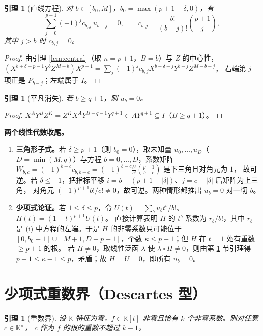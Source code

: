 \documentclass[11pt,UTF8]{ctexart}
\newtheorem{lemma}[theorem]{引理}
\theoremstyle{definition}
\newcommand{\K}{\mathbb{K}}
\begin{document}
\begin{lemma}[直线方程]\label{lem:line-eq}
对 $b\in[b_0,M]$，$b_0=\max(p+1-\delta,0)$，有
\[
\sum_{j=0}^{p+1}(-1)^{j}c_{b,j}\,u_{b-j}=0,\qquad c_{b,j}=\frac{b!}{(b-j)!}\binom{p+1}{j},
\]
其中 $j>b$ 时 $c_{b,j}=0$。
\end{lemma}

\begin{proof}
由引理 \ref{lem:central}（取 $n=p+1$，$B=b$）与 $Z$ 的中心性，
$(X^{b+\delta-p-1}Y^{b}Z^{M-b})X^{p+1}=\sum_j(-1)^jc_{b,j}X^{b+\delta-j}Y^{b-j}Z^{M-b+j}$，
右端第 $j$ 项正是 $P_{b-j}$；左端属于 $I$。
\end{proof}

\begin{lemma}[平凡消失]\label{lem:triv2}
若 $b\ge q+1$，则 $u_b=0$。
\end{lemma}

\begin{proof}
$X^{A}Y^{B}Z^{K}=Z^{K}X^{A}Y^{B-q-1}Y^{q+1}\in AY^{q+1}\subseteq I$（$B\ge q+1$）。
\end{proof}

\noindent\textbf{两个线性代数收尾。}
\begin{enumerate}[label=(\roman*)]
\item \textbf{三角形子式。}若 $\delta\ge p+1$（则 $b_0=0$），取未知量 $u_0,\dots,u_D$（$D=\min(M,q)$）与方程
$b=0,\dots,D$，系数矩阵 $W_{b,c}=(-1)^{b-c}c_{b,b-c}=(-1)^{b-c}\frac{b!}{c!}\binom{p+1}{b-c}$ 是下三角且对角元为 $1$，
故可逆。若 $\delta\le-1$，把指标平移 $i=b-(p+1+|\delta|)$、$j=c-|\delta|$ 后矩阵为上三角，
对角元 $(-1)^{p+1}b!/c!\ne0$，故可逆。两种情形都推出 $u_b=0$ 对一切 $b$。
\item \textbf{少项式论证。}若 $1\le\delta\le p$，令 $U(t)=\sum_b u_bt^{b}/b!$、$H(t)=(1-t)^{p+1}U(t)$。
直接计算表明 $H$ 的 $t^{b}$ 系数为 $r_b/b!$，其中 $r_b$ 是 (i) 中方程的左端。于是 $H$ 的非零系数只可能位于
$[0,b_0-1]\cup[M+1,D+p+1]$，个数 $\kappa\le p+1$；但 $H$ 在 $t=1$ 处有重数 $\ge p+1$ 的根。
若 $H\ne0$，取线性泛函 $\lambda$ 使 $\lambda\circ H\ne0$，则由第 \ref{sec:fewnomial} 节引理得
$p+1\le\kappa-1\le p$，矛盾；故 $H=U=0$，即所有 $u_b=0$。
\end{enumerate}

\section{少项式重数界（Descartes 型）}\label{sec:fewnomial}

\begin{lemma}[重数界]\label{lem:fewnomial2}
设 $\K$ 特征为零，$f\in\K[t]$ 非零且恰有 $k$ 个非零系数。则对任意 $c\in\K^{\times}$，
$c$ 作为 $f$ 的根的重数不超过 $k-1$。
\end{lemma}
\end{document}
